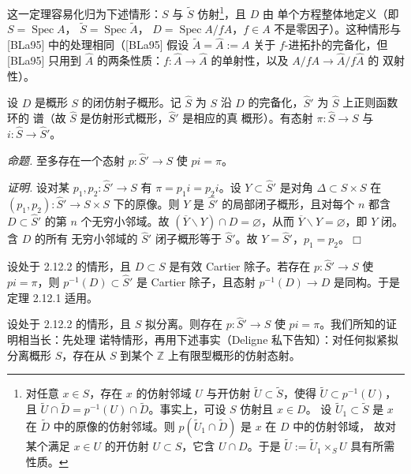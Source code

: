 
这一定理容易化归为下述情形：$S$ 与 $\widetilde{S}$
仿射\footnote{对任意 $x\in S$，存在 $x$ 的仿射邻域 $U$ 与开仿射
$\widetilde{U}\subset\widetilde{S}$，使得
$\widetilde{U}\subset p^{-1}(U)$，且 $\widetilde{U}\cap\widetilde{D}
=p^{-1}(U)\cap\widetilde{D}$。事实上，可设 $S$ 仿射且 $x\in D$。
设 $\widetilde{U}_1\subset\widetilde{S}$ 是 $x$ 在
$\widetilde{D}$ 中的原像的仿射邻域。则
$p(\widetilde{U}_1\cap\widetilde{D})$ 是 $x$ 在 $D$ 中的仿射邻域，
故对某个满足 $x\in U$ 的开仿射 $U\subset S$，它含 $U\cap D$。于是
$\widetilde{U}:=\widetilde{U}_1\times_S U$ 具有所需性质。}，且 $D$ 由
单个方程整体地定义（即 $S=\operatorname{Spec}A$，
$\widetilde{S}=\operatorname{Spec}\widetilde{A}$，
$D=\operatorname{Spec}A/fA$，$f\in A$ 不是零因子）。这种情形与
[BLa95] 中的处理相同（[BLa95] 假设
$\widetilde{A}=\widehat{A}:=A$ 关于 $f$-进拓扑的完备化，但
[BLa95] 只用到 $\widehat{A}$ 的两条性质：$f:\widehat{A}\to
\widehat{A}$ 的单射性，以及 $A/fA\to\widehat{A}/f\widehat{A}$ 的
双射性）。

 设 $D$ 是概形 $S$ 的闭仿射子概形。记 $\widehat{S}$ 为
$S$ 沿 $D$ 的完备化，$\widehat{S}'$ 为 $\widehat{S}$ 上正则函数环的
谱（故 $\widehat{S}$ 是仿射形式概形，$\widehat{S}'$ 是相应的真
概形）。有态射 $\pi:\widehat{S}\to S$ 与
$i:\widehat{S}\to\widehat{S}'$。

 \emph{命题.} 至多存在一个态射
$p:\widehat{S}'\to S$ 使 $pi=\pi$。

\emph{证明.} 设对某 $p_1,p_2:\widehat{S}'\to S$ 有
$\pi=p_1i=p_2i$。设 $Y\subset\widehat{S}'$ 是对角
$\Delta\subset S\times S$ 在
$(p_1,p_2):\widehat{S}'\to S\times S$ 下的原像。则 $Y$ 是
$\widehat{S}'$ 的局部闭子概形，且对每个 $n$ 都含
$D\subset\widehat{S}'$ 的第 $n$ 个无穷小邻域。故
$(\overline{Y}\backslash Y)\cap D=\varnothing$，从而
$\overline{Y}\backslash Y=\varnothing$，即 $Y$ 闭。含 $D$ 的所有
无穷小邻域的 $\widehat{S}'$ 闭子概形等于 $\widehat{S}'$。故
$Y=\widehat{S}'$，$p_1=p_2$。\hfill$\Box$

 设处于 2.12.2 的情形，且 $D\subset S$ 是有效 Cartier
除子。若存在 $p:\widehat{S}'\to S$ 使 $pi=\pi$，则
$p^{-1}(D)\subset\widehat{S}'$ 是 Cartier 除子，且态射
$p^{-1}(D)\to D$ 是同构。于是定理 2.12.1 适用。


 设处于 2.12.2 的情形，且 $S$ 拟分离。则存在
$p:\widehat{S}'\to S$ 使 $pi=\pi$。我们所知的证明相当长：先处理
诺特情形，再用下述事实（Deligne 私下告知）：对任何拟紧拟分离概形
$S$，存在从 $S$ 到某个 $\mathbb{Z}$ 上有限型概形的仿射态射。


